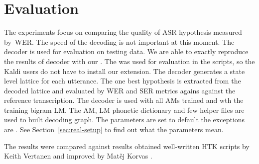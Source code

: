 




\section{Evaluation}
\label{sec:am_eval}

The experiments focus on comparing the quality of ASR hypothesis measured by~\ac{WER}.
The speed of the decoding is not important at this moment.  
The  decoder is used for evaluation on testing data.
We are able to exactly reproduce the results of  decoder with our .
The  was used for evaluation in the scripts, so the Kaldi users do not have to install our extension.
The  decoder generates a state level lattice for each utterance.
The one best hypothesis is extracted from the decoded lattice and evaluated by \ac{WER} and \ac{SER} metrics agains against the reference transcription.
The  decoder is used with all \acp{AM} trained and wth the training bigram \ac{LM}.
The \ac{AM}, \ac{LM} phonetic dictionary and few helper files are used to built  decoding graph.
The parameters are set to default the exceptions are . See Section~\ref{sec:real-setup} to find out what the parameters mean.


The results were compared against results obtained well-written \ac{HTK} scripts by Keith Vertanen and improved by Matěj Korvas \cite{korvas_2014}.



